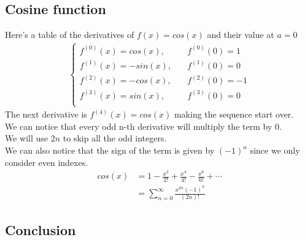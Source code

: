 \documentclass{article}
\begin{document}
\subsection{Cosine function}

Here's a table of the derivatives of \(f(x)=cos(x)\) and their value at \(a=0\)
\begin{align*}
	\begin{cases}
		f^{(0)}(x)=cos(x), \quad &f^{(0)}(0)=1 \\
		f^{(1)}(x)=-sin(x),\quad &f^{(1)}(0)=0 \\
		f^{(2)}(x)=-cos(x),\quad &f^{(2)}(0)=-1\\
		f^{(3)}(x)=sin(x), \quad &f^{(3)}(0)=0 \\
	\end{cases}
\end{align*}
The next derivative is \(f^{(4)}(x)=cos(x)\) making the sequence start over.
\\
We can notice that every odd n-th derivative will multiply the term by \(0\).
\\
We will use \(2n\) to skip all the odd integers.
\\
We can also notice that the sign of the term is given by \((-1)^n\) since we only consider even indexes.
\begin{align*}
	cos(x)&=1-\frac{x^2}{2!}+\frac{x^4}{4!}-\frac{x^6}{6!}+\cdots
	\\
	&=\sum_{n=0}^{\infty}\frac{x^{2n}(-1)^n}{(2n)!}
\end{align*}

\pagebreak

\subsection{Conclusion}
\end{document}
